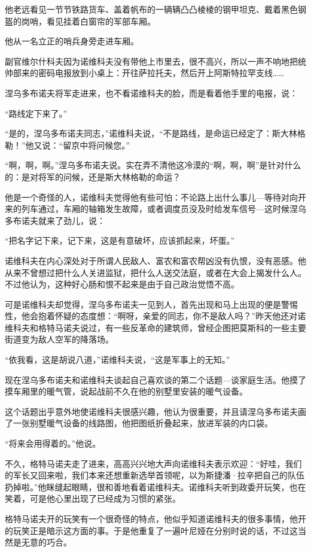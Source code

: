 他老远看见一节节铁路货车、盖着帆布的一辆辆凸凸棱棱的钢甲坦克、戴着黑色钢盔的岗哨，看见挂着白窗帘的军部车厢。

他从一名立正的哨兵身旁走进车厢。

副官维尔什科夫因为诺维科夫没有带他上市里去，很不高兴，所以一声不响地把统帅部来的密码电报放到小桌上：开往萨拉托夫，然后开上阿斯特拉罕支线……

涅乌多布诺夫将军走进来，也不看诺维科夫的脸，而是看着他手里的电报，说：

“路线定下来了。”

“是的，涅乌多布诺夫同志，”诺维科夫说，“不是路线，是命运已经定了：斯大林格勒！”他又说：“留京中将问候您。”

“啊，啊，啊。”涅乌多布诺夫说。实在弄不清他这冷漠的“啊，啊，啊”是针对什么的：是对将军的问候，还是斯大林格勒的命运？

他是一个奇怪的人，诺维科夫觉得他有些可怕：不论路上出什么事儿—等待对向开来的列车通过，车厢的轴箱发生故障，或者调度员没及时给发车信号—这时候涅乌多布诺夫就来了劲儿，说：

“把名字记下来，记下来，这是有意破坏，应该抓起来，坏蛋。”

诺维科夫在内心深处对于所谓人民敌人、富农和富农帮凶没有仇恨，没有恶感。他从来不曾想过把什么人关进监狱，把什么人送交法庭，或者在大会上揭发什么人。不过他认为，这种好心肠和恨不起来是由于自己政治觉悟不高。

可是诺维科夫却觉得，涅乌多布诺夫一见到人，首先出现和马上出现的便是警惕性，他会抱着怀疑的态度想：“啊呀，亲爱的同志，你不是敌人吗？”昨天他还对诺维科夫和格特马诺夫说过，有一些反革命的建筑师，曾经企图把莫斯科的一些主要街道变为敌人空军的降落场。

“依我看，这是胡说八道，”诺维科夫说，“这是军事上的无知。”

现在涅乌多布诺夫和诺维科夫谈起自己喜欢谈的第二个话题—谈家庭生活。他摸了摸车厢里的暖气管，说起战前不久在他的别墅里安装的暖气设备。

这个话题出乎意外地使诺维科夫很感兴趣，他认为很重要，并且请涅乌多布诺夫画了一张别墅暖气设备的线路图，他把图纸折叠起来，放进军装的内口袋。

“将来会用得着的。”他说。

不久，格特马诺夫走了进来，高高兴兴地大声向诺维科夫表示欢迎：“好哇，我们的军长又回来啦，我们本来还想重新选举首领呢，以为斯捷潘·拉辛把自己的队伍扔掉啦。”他眯缝起眼睛，很和善地看着诺维科夫。诺维科夫听到政委开玩笑，也在笑着，可是他心里出现了已经成为习惯的紧张。

格特马诺夫开的玩笑有一个很奇怪的特点，他似乎知道诺维科夫的很多事情，他开的玩笑正是暗示这方面的事。于是他重复了一遍叶尼娅在分别时说的话，不过这当然是无意的巧合。

